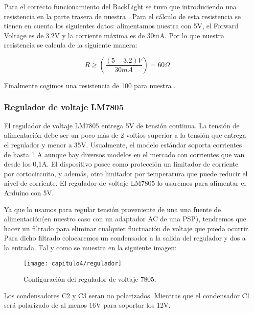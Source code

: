 Para el correcto funcionamiento del BackLight se tuvo que introduciendo una resistencia en la parte trasera de nuestra . Para el cálculo de esta resistencia se tienen en cuenta los siguientes datos: alimentamos nuestra  con 5V, el Forward Voltage es de 3.2V y la corriente máxima es de 30mA. Por lo que nuestra resistencia se calcula de la siguiente manera:

\begin{equation}
R\geq(\frac{(5-3.2)V}{30mA})=60 \Omega
\end{equation}

Finalmente cogimos una resistencia de 100 \Omega para nuestra .


\subsubsection{Regulador de voltaje LM7805}
El regulador de voltaje LM7805 \cite{7805} entrega 5V de tensión continua. La tensión de alimentación debe ser un poco más de 2 voltios superior a la tensión que entrega el regulador y menor a 35V. Usualmente, el modelo estándar soporta corrientes de hasta 1 A aunque hay diversos modelos en el mercado con corrientes que van desde los 0,1A. El dispositivo posee como protección un limitador de corriente por cortocircuito, y además, otro limitador por temperatura que puede reducir el nivel de corriente.
El regulador de voltaje LM7805 lo usaremos para alimentar el Arduino con 5V. 

Ya que lo usamos para regular tensión proveniente de una una fuente de alimentación(en nuestro caso con un adaptador AC de una PSP), tendremos que hacer un filtrado para eliminar cualquier fluctuación de voltaje que pueda ocurrir. Para dicho filtrado colocaremos un condensador a la salida del regulador y dos a la entrada. Tal y como se muestra en la siguiente imagen:

\smallskip
\begin{figure}[H]%
\noindent \begin{centering}
\texttt{[image: capitulo4/regulador]}
\par\end{centering}
\caption{\label{fig:regulador} Configuración del regulador de voltaje 7805.}
\end{figure}
\hfill

Los condensadores C2 y C3 seran no polarizados. Mientras que el condensador C1 será polarizado de al menos 16V para soportar los 12V.

